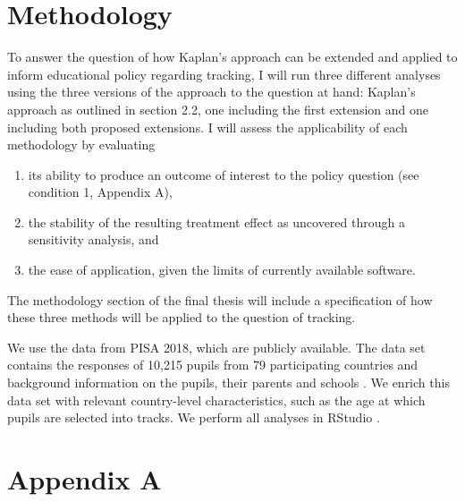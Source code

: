 \documentclass{article}
\begin{document}
\pagebreak

\section{Methodology}
To answer the question of how Kaplan's approach can be extended and applied to inform educational policy regarding tracking, I will run three different analyses using the three versions of the approach to the question at hand: Kaplan's approach as outlined in section 2.2, one including the first extension and one including both proposed extensions. I will assess the applicability of each methodology by evaluating 

\begin{enumerate}    
    \item its ability to produce an outcome of interest to the policy question (see condition 1, Appendix A),
    \item the stability of the resulting treatment effect as uncovered through a sensitivity analysis, and 
    \item the ease of application, given the limits of currently available software. 
\end{enumerate}
The methodology section of the final thesis will include a specification of how these three methods will be applied to the question of tracking. 

We use the data from PISA 2018, which are publicly available. The data set contains the responses of 10,215 pupils from 79 participating countries and background information on the pupils, their parents and schools \parencite{oecd_pisa_2020}. We enrich this data set with relevant country-level characteristics, such as the age at which pupils are selected into tracks. We perform all analyses in RStudio \parencite{RStudio}.

\newpage
\printbibliography

\newpage
\section*{Appendix A}

\end{document}
